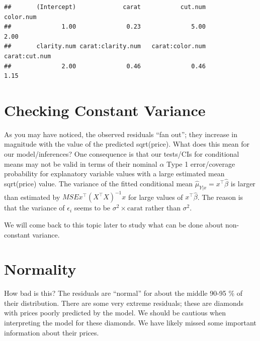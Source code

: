 \documentclass[
]{book}
\begin{document}
\begin{verbatim}
##       (Intercept)             carat           cut.num         color.num 
##              1.00              0.23              5.00              2.00 
##       clarity.num carat:clarity.num   carat:color.num     carat:cut.num 
##              2.00              0.46              0.46              1.15
\end{verbatim}

\hypertarget{checking-constant-variance}{%
\section{Checking Constant Variance}\label{checking-constant-variance}}

As you may have noticed, the observed residuals ``fan out''; they increase in magnitude with the value of the predicted sqrt(price). What does this mean for our model/inferences? One consequence is that our tests/CIs for conditional means may not be valid in terms of their nominal \(\alpha\) Type 1 error/coverage probability for explanatory variable values with a large estimated mean sqrt(price) value. The variance of the fitted conditional mean \(\hat\mu_{Y|x} = x^{\top}\hat\beta\) is larger than estimated by \(MSEx^\top(X^\top X)^{-1}x\) for large values of \(x^{\top}\hat\beta\). The reason is that the variance of \(\epsilon_i\) seems to be \(\sigma^2 \times\text{carat}\) rather than \(\sigma^2\).

We will come back to this topic later to study what can be done about non-constant variance.

\hypertarget{normality}{%
\section{Normality}\label{normality}}

How bad is this? The residuals are ``normal'' for about the middle 90-95 \% of their distribution. There are some very extreme residuals; these are diamonds with prices poorly predicted by the model. We should be cautious when interpreting the model for these diamonds. We have likely missed some important information about their prices.
\end{document}
